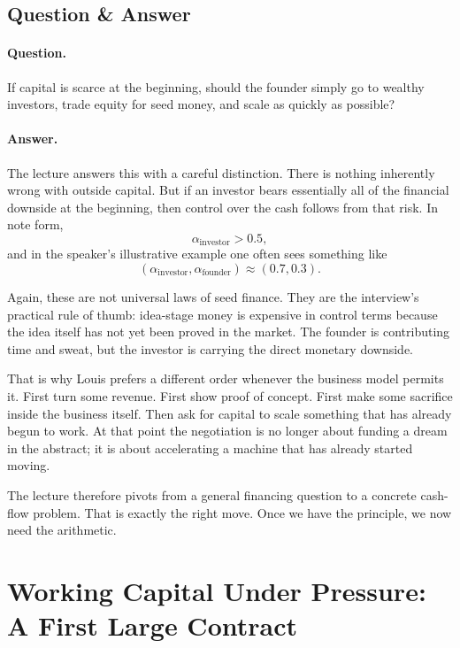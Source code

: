 \subsection{Question \& Answer}

\paragraph{Question.}
If capital is scarce at the beginning, should the founder simply go to wealthy investors, trade equity for seed money, and scale as quickly as possible?

\paragraph{Answer.}
The lecture answers this with a careful distinction. There is nothing inherently wrong with outside capital. But if an investor bears essentially all of the financial downside at the beginning, then control over the cash follows from that risk. In note form,
\begin{equation}
\alpha_{\mathrm{investor}} > 0.5,
\end{equation}
and in the speaker's illustrative example one often sees something like
\begin{equation}
(\alpha_{\mathrm{investor}},\alpha_{\mathrm{founder}})\approx (0.7,0.3).
\end{equation}

Again, these are not universal laws of seed finance. They are the interview's practical rule of thumb: idea-stage money is expensive in control terms because the idea itself has not yet been proved in the market. The founder is contributing time and sweat, but the investor is carrying the direct monetary downside.

That is why Louis prefers a different order whenever the business model permits it. First turn some revenue. First show proof of concept. First make some sacrifice inside the business itself. Then ask for capital to scale something that has already begun to work. At that point the negotiation is no longer about funding a dream in the abstract; it is about accelerating a machine that has already started moving.

The lecture therefore pivots from a general financing question to a concrete cash-flow problem. That is exactly the right move. Once we have the principle, we now need the arithmetic.

\section{Working Capital Under Pressure: A First Large Contract}

